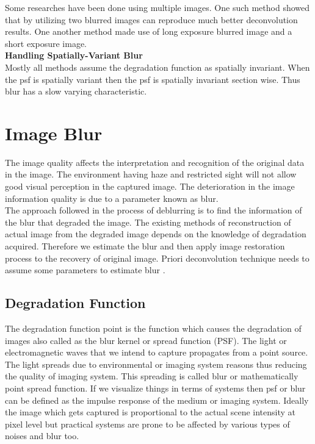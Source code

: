 \documentclass{article}
\begin{document}
Some researches have been done using multiple images. One such method showed that by utilizing two blurred images can reproduce much better deconvolution results. One another method made use of long exposure blurred image and a short exposure image.  \\

\textbf{Handling Spatially-Variant Blur} \\

Mostly all methods assume the degradation function as spatially invariant. When the psf is spatially variant then the psf is spatially invariant section wise. Thus blur has a slow varying characteristic. 

\clearpage
\section{Image Blur}
The image quality affects the interpretation and recognition of the original data in the image. The environment having haze and restricted sight will not allow good visual perception in the captured image. The deterioration in the image information quality is due to a parameter known as blur. \\

The approach followed in the process of deblurring is to find the information of the blur that degraded the image. The existing methods of reconstruction of actual image from the degraded image depends on the knowledge of degradation acquired. Therefore we estimate the blur and then apply image restoration process to the recovery of original image. Priori deconvolution technique needs to assume some parameters to estimate blur \cite{jiang-ming}. \\

\subsection{Degradation Function}
The degradation function point is the function which causes the degradation of images also called as the blur kernel or spread function (PSF). The light or electromagnetic waves that we intend to capture propagates from a point source. The light spreads due to environmental or imaging system reasons thus reducing the quality of imaging system. This spreading is called blur or mathematically point spread function. If we visualize things in terms of systems then psf or blur can be defined as the impulse response of the medium or imaging system. Ideally the image which gets captured is proportional to the actual scene intensity at pixel level but practical systems are prone to be affected by various types of noises and blur too. 
\end{document}
